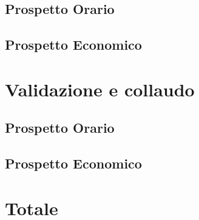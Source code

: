 \documentclass[PianoDiProgetto.tex]{subfiles}
\begin{document}
\subsection{Prospetto Orario}
\subsection{Prospetto Economico}

\section{Validazione e collaudo}
\subsection{Prospetto Orario}
\subsection{Prospetto Economico}

\section{Totale}
\end{document}
